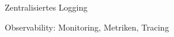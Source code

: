 \begin{frame}
	\frametitle{\insertsection}
    \framesubtitle{\insertsubsection}
    \vspace*{-0.5cm}
    \begin{block}{Zentralisiertes Logging}
    \end{block}

	\begin{block}{Observability: Monitoring, Metriken, Tracing}
    \end{block}
\end{frame}


%
%
%
%

